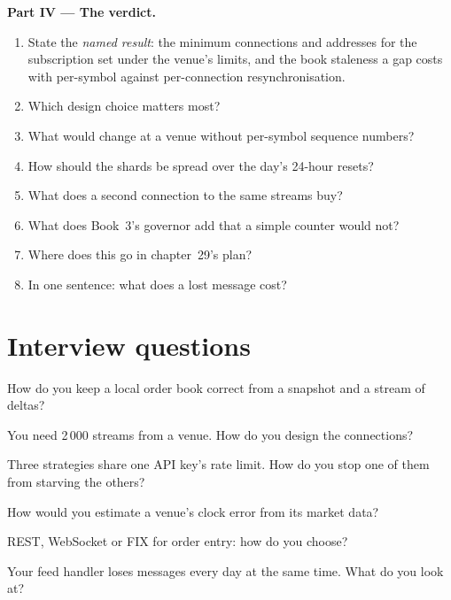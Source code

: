 \begin{problem}
\medskip\noindent\textbf{Part IV --- The verdict.}
\begin{enumerate}[resume]
\item State the \emph{named result}: the minimum connections and addresses for the subscription set under the venue's limits, and the book staleness a gap
  costs with per-symbol against per-connection resynchronisation.
\item Which design choice matters most?
\item What would change at a venue without per-symbol sequence numbers?
\item How should the shards be spread over the day's 24-hour resets?
\item What does a second connection to the same streams buy?
\item What does Book~3's governor add that a simple counter would not?
\item Where does this go in chapter~29's plan?
\item In one sentence: what does a lost message cost?
\end{enumerate}
\end{problem}

\section{Interview questions}

\begin{interviewq}\label{iq:nw:api-engineering-for-crypto-venues:1}
How do you keep a local order book correct from a snapshot and a stream of deltas?
\end{interviewq}

\begin{interviewq}\label{iq:nw:api-engineering-for-crypto-venues:2}
You need 2\,000 streams from a venue. How do you design the connections?
\end{interviewq}

\begin{interviewq}\label{iq:nw:api-engineering-for-crypto-venues:3}
Three strategies share one API key's rate limit. How do you stop one of them from starving the others?
\end{interviewq}

\begin{interviewq}\label{iq:nw:api-engineering-for-crypto-venues:4}
How would you estimate a venue's clock error from its market data?
\end{interviewq}

\begin{interviewq}\label{iq:nw:api-engineering-for-crypto-venues:5}
REST, WebSocket or FIX for order entry: how do you choose?
\end{interviewq}

\begin{interviewq}\label{iq:nw:api-engineering-for-crypto-venues:6}
Your feed handler loses messages every day at the same time. What do you look at?
\end{interviewq}

